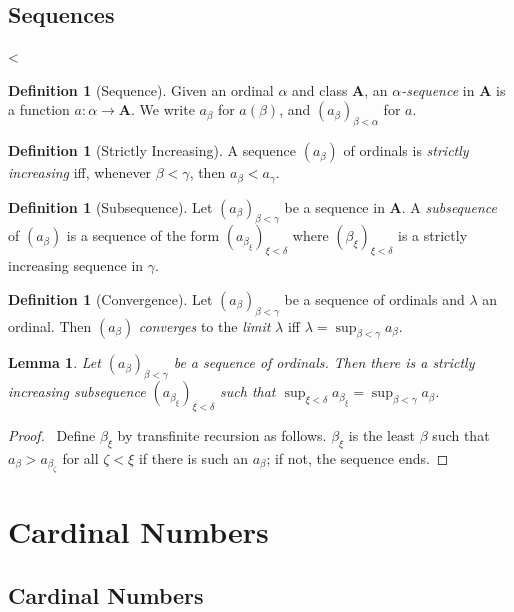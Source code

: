 \documentclass{book}
\let\qed\relax
\newtheorem{lm}[ax]{Lemma}
\theoremstyle{definition}
\newtheorem{df}[ax]{Definition}
\begin{document}
\section{Sequences}
<
\begin{df}[Sequence]
Given an ordinal $\alpha$ and class $\mathbf{A}$, an \emph{$\alpha$-sequence} in $\mathbf{A}$ is a function $a : \alpha \rightarrow \mathbf{A}$. We write $a_\beta$ for $a(\beta)$, and $(a_\beta)_{\beta < \alpha}$ for $a$.
\end{df}

\begin{df}[Strictly Increasing]
A sequence $(a_\beta)$ of ordinals is \emph{strictly increasing} iff, whenever $\beta < \gamma$, then $a_\beta < a_\gamma$.
\end{df}

\begin{df}[Subsequence]
Let $(a_\beta)_{\beta < \gamma}$ be a sequence in $\mathbf{A}$. A \emph{subsequence} of $(a_\beta)$ is a sequence of the form $(a_{\beta_\xi})_{\xi < \delta}$ where $(\beta_\xi)_{\xi < \delta}$ is a strictly increasing sequence in $\gamma$.
\end{df}

\begin{df}[Convergence]
Let $(a_\beta)_{\beta < \gamma}$ be a sequence of ordinals and $\lambda$ an ordinal. Then $(a_\beta)$ \emph{converges} to the \emph{limit} $\lambda$ iff $\lambda = \sup_{\beta < \gamma} a_\beta$.
\end{df}

\begin{lm}
\label{lm:convergentsubsequence}
Let $(a_\beta)_{\beta < \gamma}$ be a sequence of ordinals. Then there is a strictly increasing subsequence $(a_{\beta_\xi})_{\xi < \delta}$ such that $\sup_{\xi < \delta} a_{\beta_\xi} = \sup_{\beta < \gamma} a_\beta$.
\end{lm}

\begin{proof}
\pf\ Define $\beta_\xi$ by transfinite recursion as follows. $\beta_\xi$ is the least $\beta$ such that $a_\beta > a_{\beta_\zeta}$ for all $\zeta < \xi$ if there is such an $a_\beta$; if not, the sequence ends.
\qed
\end{proof}

\chapter{Cardinal Numbers}

\section{Cardinal Numbers}
\end{document}
